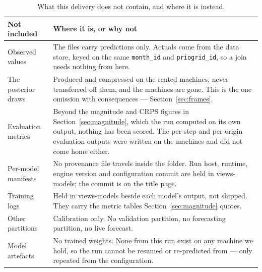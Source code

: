 \begin{table}[h!]
\centering
\small
\renewcommand{\arraystretch}{1.3}
\caption{What this delivery does not contain, and where it is instead.}
\label{tab:not-included}
\begin{tabular}{@{}p{4.4cm}p{10.2cm}@{}}
\toprule
\textbf{Not included} & \textbf{Where it is, or why not} \\ \midrule
Observed values &
  The files carry predictions only. Actuals come from the data store, keyed on the same
  \texttt{month\_id} and \texttt{priogrid\_id}, so a join needs nothing from here. \\ \addlinespace
The posterior draws &
  Produced and compressed on the rented machines, never transferred off them, and the machines are
  gone. This is the one omission with consequences --- Section~\ref{sec:frames}. \\ \addlinespace
Evaluation metrics &
  Beyond the magnitude and CRPS figures in Section~\ref{sec:magnitude}, which the run computed on
  its own output, nothing has been scored. The per-step and per-origin evaluation outputs were
  written on the machines and did not come home either. \\ \addlinespace
Per-model manifests &
  No provenance file travels inside the folder. Run host, runtime, engine version and
  configuration commit are held in views-models; the commit is on the title page. \\ \addlinespace
Training logs &
  Held in views-models beside each model's output, not shipped. They carry the metric tables
  Section~\ref{sec:magnitude} quotes. \\ \addlinespace
Other partitions &
  Calibration only. No validation partition, no forecasting partition, no live forecast. \\ \addlinespace
Model artefacts &
  No trained weights. None from this run exist on any machine we hold, so the run cannot be
  resumed or re-predicted from --- only repeated from the configuration. \\
\bottomrule
\end{tabular}
\end{table}

